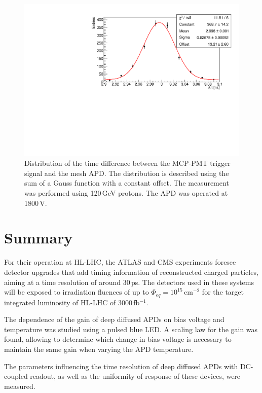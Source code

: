 \documentclass[review,number,sort&compress]{elsarticle}
\begin{document}
\begin{figure}
  \centering
  \includegraphics[width = 0.6 \columnwidth]{dtDistr8x8asicTB}
  \caption{Distribution of the time difference between the MCP-PMT trigger signal and the mesh APD. The distribution is described using the sum of a Gauss function with a constant offset. The measurement was performed using 120\,GeV protons. The APD was operated at 1800\,V.}
  \label{fig:dtDistrTB}
\end{figure}

\section{Summary}
\label{sec:summary}

For their operation at HL-LHC, the ATLAS and CMS experiments foresee detector upgrades that add timing information of reconstructed charged particles, aiming at a time resolution of around 30\,ps.
The detectors used in these systems will be exposed to irradiation fluences of up to $\Phi_{eq} = 10^{15}$\,cm$^{-2}$ for the target integrated luminosity of HL-LHC of 3000\,fb$^{-1}$.

The dependence of the gain of deep diffused APDs on bias voltage and temperature was studied using a pulsed blue LED.
A scaling law for the gain was found, allowing to determine which change in bias voltage is necessary to maintain the same gain when varying the APD temperature.

The parameters influencing the time resolution of deep diffused APDs with DC-coupled readout, as well as the uniformity of response of these devices, were measured.
\end{document}
